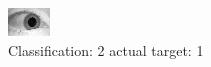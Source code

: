 \begin{figure}[h!]
\begin{center}
\includegraphics[width=0.60\columnwidth]{figures/ID1548_class_2_target_1.png}
\end{center}
\caption{ Classification: 2 actual target: 1}
\label{fig:ID1548_class_2_target_1}
\end{figure}
